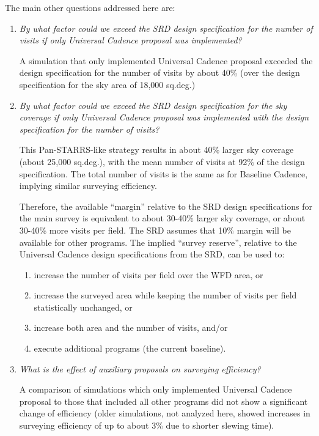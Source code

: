 \vskip 0.2in
The main other questions addressed here are:

\begin{enumerate}

\item {\it By what factor could we exceed the SRD design specification
for the number of visits if only Universal Cadence proposal was
implemented?}

A simulation that only implemented Universal Cadence proposal exceeded
the design specification for the number of visits by about 40\% (over
the design specification for the sky area of 18,000 sq.deg.)

\item {\it By what factor could we exceed the SRD design specification
for the sky coverage if only Universal Cadence proposal was
implemented with the design specification for the number of visits?}

This Pan-STARRS-like strategy results in about 40\% larger sky
coverage (about 25,000 sq.deg.), with the mean number of visits at
92\% of the design specification. The total number of visits is the
same as for Baseline Cadence, implying similar surveying efficiency.

Therefore, the available ``margin'' relative to the SRD design specifications
for the main survey is equivalent to about 30-40\% larger sky coverage, or
about 30-40\% more visits per field. The SRD assumes that 10\% margin
will be available for other programs. The implied ``survey reserve'',
relative to the Universal Cadence design specifications from the SRD, can
be used to:
  \begin{enumerate}
  \item increase the number of visits per field over the WFD area,  or
  \item increase the surveyed area while keeping the number of visits
  per field statistically unchanged, or
  \item increase both area and the number of visits, and/or
  \item execute additional programs (the current baseline).
  \end{enumerate}

\item {\it What is the effect of auxiliary proposals on surveying
efficiency?}

A comparison of simulations which only implemented Universal Cadence
proposal to those that included all other programs did not show a
significant change of efficiency (older simulations, not analyzed
here, showed increases in surveying efficiency of up to about 3\% due
to shorter slewing time).



\end{enumerate}
